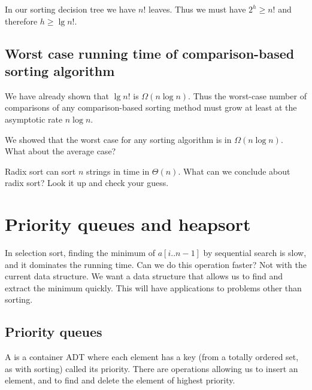 In our sorting decision tree we have $n!$ leaves. 
Thus we must have $2^h \geq n!$ and therefore $h \geq \lg n!$. 

\section{Worst case running time of comparison-based sorting algorithm}
We have already shown that $\lg n!$ is $\Omega (n \log n)$. Thus the
worst-case number of comparisons of any comparison-based sorting method must 
grow at least at the asymptotic rate $n \log n$.

\begin{Boxample}[4]
We showed that the worst case for any sorting algorithm is in $\Omega (n \log n)$. What about the average case?
\end{Boxample}

\begin{Boxample}[2]
Radix sort can sort $n$ strings in time in $\Theta(n)$.
What can we conclude about radix sort? Look it up and check your guess.
\end{Boxample}



\chapter{Priority queues and heapsort} %
\label{sec:heapsort}
In selection sort, finding the minimum of $a[i..n-1]$ by sequential search is slow, 
and it dominates the running time. 
Can we do this operation faster? Not with the current data structure. 
We want a data structure that allows us to find and extract the minimum quickly. 
This will have applications to problems other than sorting.

\section{Priority queues}
\begin{Definition}
A  is a container ADT where each element 
has a key (from a totally ordered set, as with sorting) called its priority. There are operations allowing us to insert an 
element, and to find and delete the element of highest priority. 
\end{Definition}

